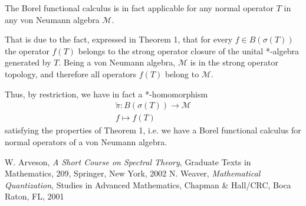 \documentclass[12pt]{article}
\begin{document}
The Borel functional calculus is in fact applicable for any normal operator $T$ in any von Neumann algebra $\mathcal{M}$.

That is due to the fact, expressed in Theorem 1, that for every $f \in B(\sigma(T))$ the operator $f(T)$ belongs to the strong operator closure of the unital *-algebra generated by $T$. Being a von Neumann algebra, $\mathcal{M}$ is  in the strong operator topology, and therefore all operators $f(T)$ belong to $\mathcal{M}$.

Thus, by restriction, we have in fact a *-homomorphism
\begin{align*}
\widetilde{\pi}: B(\sigma(T)) \longrightarrow \mathcal{M} \\
f \longmapsto f(T)
\end{align*}
satisfying the properties of Theorem 1, i.e. we have a Borel functional calculus for normal operators of a von Neumann algebra.

\begin{thebibliography}{9}
 W. Arveson, \emph{A Short Course on Spectral Theory}, Graduate Texts in Mathematics, 209, Springer, New York, 2002
 N. Weaver, \emph{Mathematical Quantization}, Studies in Advanced Mathematics, Chapman \& Hall/CRC, Boca Raton, FL, 2001
\end{thebibliography}
\end{document}
